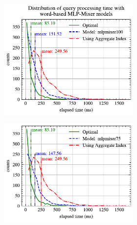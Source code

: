 \documentclass[conference]{IEEEtran}
\begin{document}
\begin{figure}[!h]
	\centering
	\begin{subfigure}{0.45\textwidth}
		\begin{subfigure}{\textwidth}
			\centering
			\includegraphics[]{graphics/perf_dist_mlpmixer100_A.pdf}
		\end{subfigure}
		\vfill
		\begin{subfigure}{\textwidth}
			\centering
			\includegraphics[]{graphics/perf_dist_mlpmixer75_A.pdf}
		\end{subfigure}
		\vfill
		\begin{subfigure}{\textwidth}
			\centering

\end{subfigure}
\end{subfigure}
\end{figure}
\end{document}
